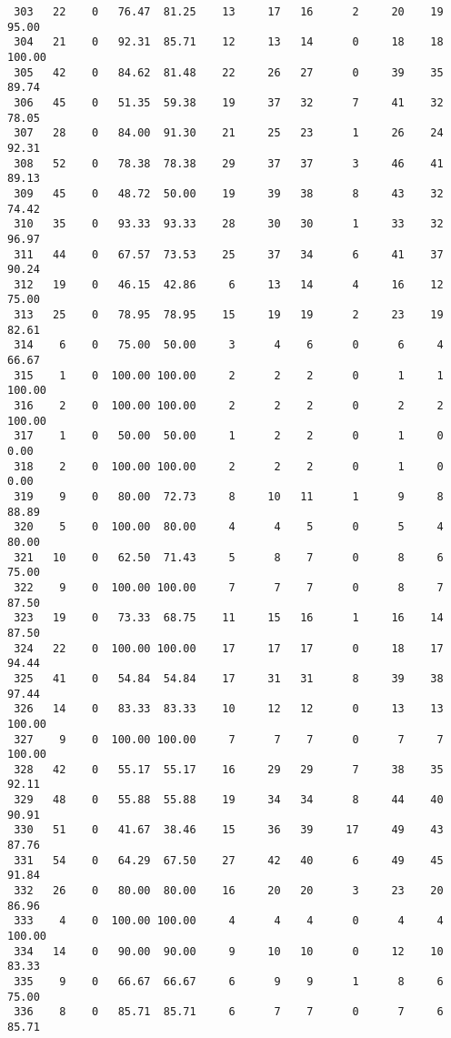 \begin{verbatim}
 303   22    0   76.47  81.25    13     17   16      2     20    19    95.00
 304   21    0   92.31  85.71    12     13   14      0     18    18   100.00
 305   42    0   84.62  81.48    22     26   27      0     39    35    89.74
 306   45    0   51.35  59.38    19     37   32      7     41    32    78.05
 307   28    0   84.00  91.30    21     25   23      1     26    24    92.31
 308   52    0   78.38  78.38    29     37   37      3     46    41    89.13
 309   45    0   48.72  50.00    19     39   38      8     43    32    74.42
 310   35    0   93.33  93.33    28     30   30      1     33    32    96.97
 311   44    0   67.57  73.53    25     37   34      6     41    37    90.24
 312   19    0   46.15  42.86     6     13   14      4     16    12    75.00
 313   25    0   78.95  78.95    15     19   19      2     23    19    82.61
 314    6    0   75.00  50.00     3      4    6      0      6     4    66.67
 315    1    0  100.00 100.00     2      2    2      0      1     1   100.00
 316    2    0  100.00 100.00     2      2    2      0      2     2   100.00
 317    1    0   50.00  50.00     1      2    2      0      1     0     0.00
 318    2    0  100.00 100.00     2      2    2      0      1     0     0.00
 319    9    0   80.00  72.73     8     10   11      1      9     8    88.89
 320    5    0  100.00  80.00     4      4    5      0      5     4    80.00
 321   10    0   62.50  71.43     5      8    7      0      8     6    75.00
 322    9    0  100.00 100.00     7      7    7      0      8     7    87.50
 323   19    0   73.33  68.75    11     15   16      1     16    14    87.50
 324   22    0  100.00 100.00    17     17   17      0     18    17    94.44
 325   41    0   54.84  54.84    17     31   31      8     39    38    97.44
 326   14    0   83.33  83.33    10     12   12      0     13    13   100.00
 327    9    0  100.00 100.00     7      7    7      0      7     7   100.00
 328   42    0   55.17  55.17    16     29   29      7     38    35    92.11
 329   48    0   55.88  55.88    19     34   34      8     44    40    90.91
 330   51    0   41.67  38.46    15     36   39     17     49    43    87.76
 331   54    0   64.29  67.50    27     42   40      6     49    45    91.84
 332   26    0   80.00  80.00    16     20   20      3     23    20    86.96
 333    4    0  100.00 100.00     4      4    4      0      4     4   100.00
 334   14    0   90.00  90.00     9     10   10      0     12    10    83.33
 335    9    0   66.67  66.67     6      9    9      1      8     6    75.00
 336    8    0   85.71  85.71     6      7    7      0      7     6    85.71

\end{verbatim}
